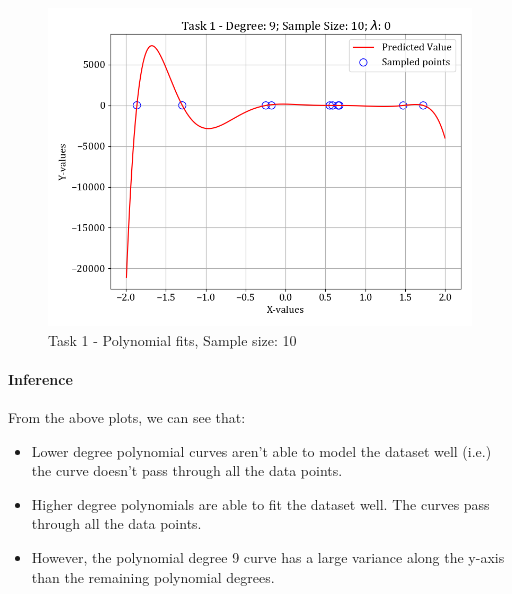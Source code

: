 \documentclass[12pt,a4paper]{article}
\begin{document}
\begin{figure}[H]
    \includegraphics[scale=0.425]{images/t1_d1/d_9_size_10_l_0.png}
    \caption{Task 1 - Polynomial fits, Sample size: 10}
\end{figure}

\paragraph{Inference}
From the above plots, we can see that:
\begin{itemize}
    \itemsep0em
    \item Lower degree polynomial curves aren't able to model the dataset well (i.e.) the curve doesn't pass through all the data points.
    \item Higher degree polynomials are able to fit the dataset well. The curves pass through all the data points.
    \item However, the polynomial degree 9 curve has a large variance along the y-axis than the remaining polynomial degrees.
\end{itemize}
\end{document}

